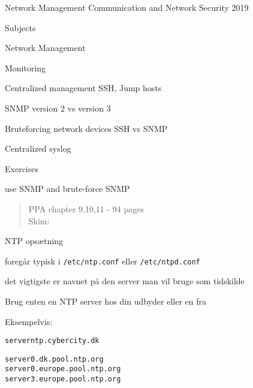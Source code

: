 \documentclass[Screen16to9,17pt]{foils}
\begin{document}
\mytitlepage
{Network Management}
{Communication and Network Security 2019}




\begin{list1}
\item Subjects
\begin{list2}
\item Network Management
\item Monitoring
\item Centralized management SSH, Jump hosts
\item SNMP version 2 vs version 3
\item Bruteforcing network devices SSH vs SNMP
\item Centralized syslog
\end{list2}
\item Exercises
\begin{list2}
\item use SNMP and brute-force SNMP
\end{list2}
\end{list1}



\begin{quote}
\end{quote}

\begin{quote}
PPA chapter 9,10,11 - 94 pages\\
Skim:\\
\end{quote}





\begin{list1}
\item NTP opsætning
\item foregår typisk i \verb+/etc/ntp.conf+ eller \verb+/etc/ntpd.conf+
\item det vigtigste er navnet på den server man vil bruge som tidskilde
\item Brug enten en NTP server hos din udbyder eller en fra 
\item Eksempelvis:
\end{list1}

\begin{alltt}
server ntp.cybercity.dk

server 0.dk.pool.ntp.org
server 0.europe.pool.ntp.org
server 3.europe.pool.ntp.org

\end{alltt}
\end{document}
